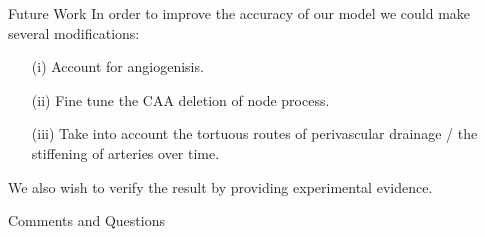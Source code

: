 \documentclass{beamer}
\begin{document}
\begin{frame}{Future Work}
In order to improve the accuracy of our model we could make several modifications:
\begin{itemize}
 \item[(i)] Account for angiogenisis.
 \item[(ii)] Fine tune the CAA deletion of node process. 
 \item[(iii)] Take into account the tortuous routes of perivascular drainage / the stiffening of arteries over time.
 
\end{itemize}

We also wish to verify the result by providing experimental evidence.  


\end{frame}

\begin{frame}{Comments and Questions}

\end{frame}
\end{document}
